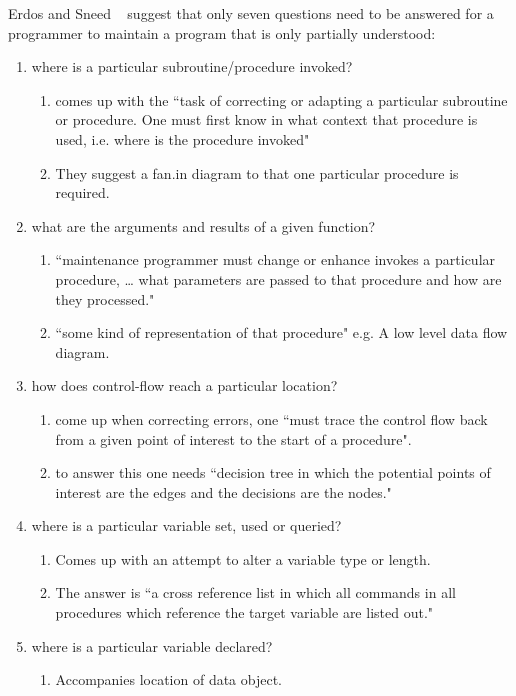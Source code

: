 Erdos and Sneed ~\cite{Erdos:1998} suggest that only seven questions need to be answered for a programmer to maintain a program that is only partially understood:
\begin{enumerate}
\item where is a particular subroutine/procedure invoked? 
	\begin{enumerate}
	\item comes up with the ``task of correcting or adapting a particular subroutine or procedure. One must first know in what context that procedure is used, i.e. where is the procedure invoked"
	\item They suggest a fan.in diagram to that one particular procedure is required. 
    \end{enumerate}
\item	what are the arguments and results of a given function? 
	\begin{enumerate}
	\item ``maintenance programmer must change or enhance invokes a particular procedure, … what parameters are passed to that procedure and how are they processed." 
	\item ``some kind of representation of that procedure" e.g. A low level data flow diagram.
    \end{enumerate}
\item how does control-flow reach a particular location? 
	\begin{enumerate}
	\item come up when correcting errors, one ``must trace the control flow back from a given point of interest to the start of a procedure".
	\item to answer this one needs ``decision tree in which the potential points of interest are the edges and the decisions are the nodes."
    \end{enumerate}
\item where is a particular variable set, used or queried? 
	\begin{enumerate}
	\item Comes up with an attempt to alter a variable type or length. 
	\item The answer is ``a cross reference list in which all commands in all procedures which reference the target variable are listed out."
    \end{enumerate}
\item where is a particular variable declared? 
	\begin{enumerate}
	\item Accompanies location of data object.

\end{enumerate}
\end{enumerate}
